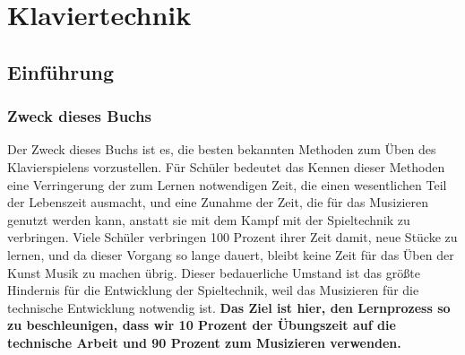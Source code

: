 
\part{Klaviertechnik}\hypertarget{c1i1}{}

\chapter{Einführung} 

\section{Zweck dieses Buchs}

Der Zweck dieses Buchs ist es, die besten bekannten Methoden zum Üben des Klavierspielens vorzustellen.
Für Schüler bedeutet das 
Kennen dieser Methoden eine Verringerung der zum Lernen notwendigen Zeit, die einen wesentlichen Teil der Lebenszeit ausmacht, und eine Zunahme der Zeit, die für das Musizieren genutzt werden kann, anstatt sie mit dem Kampf mit der Spieltechnik zu verbringen.
Viele Schüler verbringen 100 Prozent ihrer Zeit damit, neue Stücke zu lernen, und da dieser Vorgang so lange dauert, bleibt keine Zeit für das Üben der Kunst Musik zu machen übrig.
Dieser bedauerliche Umstand ist das größte Hindernis für die Entwicklung der Spieltechnik, weil das Musizieren für die technische Entwicklung notwendig ist.
\textbf{Das Ziel ist hier, den Lernprozess so zu beschleunigen, dass wir 10 Prozent der Übungszeit auf die technische Arbeit und 90 Prozent zum Musizieren verwenden.}

